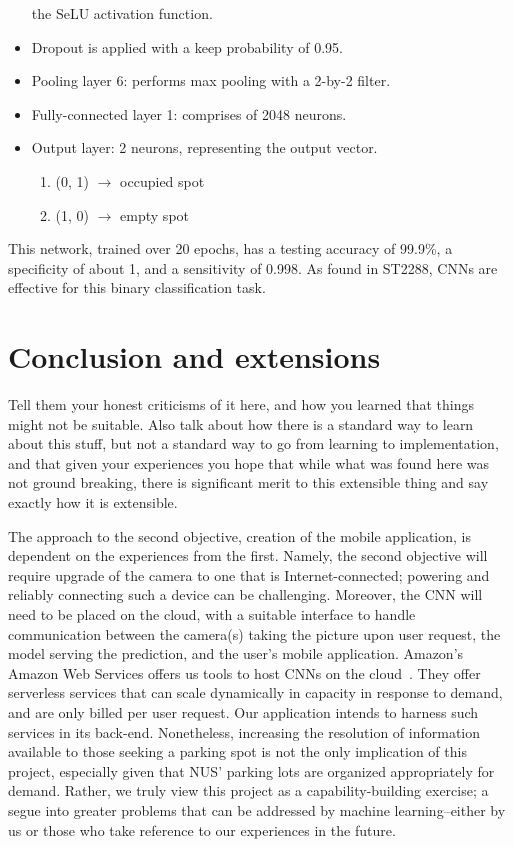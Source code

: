 \documentclass[a4paper, 11pt]{article} %
\begin{document}
\begin{itemize}
		the SeLU activation function.
		\item Dropout is applied with a keep probability of 0.95.
		\item[] Pooling layer 6: performs max pooling with a 2-by-2 filter.
		\item[] Fully-connected layer 1: comprises of 2048 neurons.
		\item[] Output layer: 2 neurons, representing the output vector.
		\vspace*{-4mm}
		\begin{enumerate}
			\setlength\itemsep{-3mm}
			\item[] (0, 1) $\rightarrow$ occupied spot
			\item[] (1, 0) $\rightarrow$ empty spot
		\end{enumerate}
	\end{itemize}
	This network, trained over 20 epochs, has a testing accuracy of 99.9\%, a specificity of about 1, and a
	sensitivity of 0.998. As found in ST2288, CNNs are effective for this binary classification task.	

\section{Conclusion and extensions}
	Tell them your honest criticisms of it here, and how you learned that things
	might not be suitable.
	Also talk about how there is a standard way to learn about this stuff, but
	not a standard way to go from learning to implementation, and that given your
	experiences you hope that while what was found here was not ground breaking,
	there is significant merit to this extensible thing and say exactly how it is
	extensible.

	The approach to the second objective, creation of the mobile application, is
	dependent on the experiences from the first. Namely, the second objective will
	require upgrade of the camera to one that is Internet-connected; powering and
	reliably connecting such a device can be challenging.  Moreover, the CNN will
	need to be placed on the cloud, with a suitable interface to handle
	communication between the camera(s) taking the picture upon user request, the
	 model serving the prediction, and the user's mobile application. Amazon's
	Amazon Web Services offers us tools to host CNNs on the cloud~\cite{aws}\relax.
	They offer serverless services that can scale dynamically in capacity in
	response to demand, and are only billed per user request. Our application
	intends to harness such services in its back-end.  Nonetheless, increasing the
	resolution of information available to those seeking a parking spot is not the
	only implication of this project, especially given that NUS' parking lots are
	organized appropriately for demand. Rather, we truly view this project as a
	capability-building exercise; a segue into greater problems that can be
	addressed by machine learning--either by us or those who take reference to our
	experiences in the future.
\end{document}

